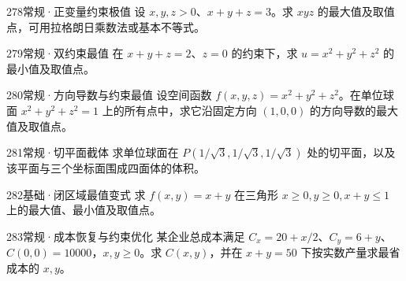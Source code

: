 \begin{exercise}{278}{常规·正变量约束极值}
设 $x,y,z>0$、$x+y+z=3$。求 $xyz$ 的最大值及取值点，可用拉格朗日乘数法或基本不等式。
\end{exercise}
\begin{exercise}{279}{常规·双约束最值}
在 $x+y+z=2$、$z=0$ 的约束下，求 $u=x^2+y^2+z^2$ 的最小值及取值点。
\end{exercise}
\begin{exercise}{280}{常规·方向导数与约束最值}
设空间函数 $f(x,y,z)=x^2+y^2+z^2$。在单位球面 $x^2+y^2+z^2=1$ 上的所有点中，求它沿固定方向 $(1,0,0)$ 的方向导数的最大值及取值点。
\end{exercise}
\begin{exercise}{281}{常规·切平面截体}
求单位球面在 $P(1/\sqrt3,1/\sqrt3,1/\sqrt3)$ 处的切平面，以及该平面与三个坐标面围成四面体的体积。
\end{exercise}
\begin{exercise}{282}{基础·闭区域最值变式}
求 $f(x,y)=x+y$ 在三角形 $x\ge0,y\ge0,x+y\le1$ 上的最大值、最小值及取值点。
\end{exercise}
\begin{exercise}{283}{常规·成本恢复与约束优化}
某企业总成本满足 $C_x=20+x/2$、$C_y=6+y$、$C(0,0)=10000$，$x,y\ge0$。求 $C(x,y)$，并在 $x+y=50$ 下按实数产量求最省成本的 $x,y$。
\end{exercise}

